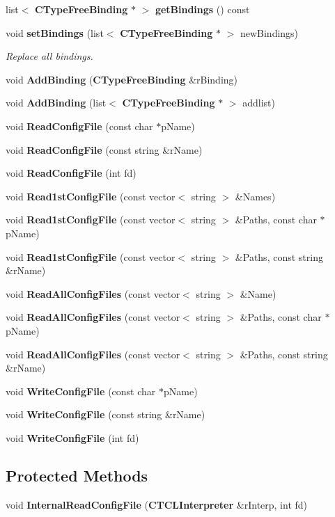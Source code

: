 \begin{CompactItemize}
\item 
list$<$ {\bf CType\-Free\-Binding} $\ast$ $>$ {\bf get\-Bindings} () const
\item 
void {\bf set\-Bindings} (list$<$ {\bf CType\-Free\-Binding} $\ast$ $>$ new\-Bindings)
\begin{CompactList}\small\item\em Replace all bindings.\item\end{CompactList}\item 
void {\bf Add\-Binding} ({\bf CType\-Free\-Binding} \&r\-Binding)
\item 
void {\bf Add\-Binding} (list$<$ {\bf CType\-Free\-Binding} $\ast$ $>$ addlist)
\item 
void {\bf Read\-Config\-File} (const char $\ast$p\-Name)
\item 
void {\bf Read\-Config\-File} (const string \&r\-Name)
\item 
void {\bf Read\-Config\-File} (int fd)
\item 
void {\bf Read1st\-Config\-File} (const vector$<$ string $>$ \&Names)
\item 
void {\bf Read1st\-Config\-File} (const vector$<$ string $>$ \&Paths, const char $\ast$p\-Name)
\item 
void {\bf Read1st\-Config\-File} (const vector$<$ string $>$ \&Paths, const string \&r\-Name)
\item 
void {\bf Read\-All\-Config\-Files} (const vector$<$ string $>$ \&Name)
\item 
void {\bf Read\-All\-Config\-Files} (const vector$<$ string $>$ \&Paths, const char $\ast$p\-Name)
\item 
void {\bf Read\-All\-Config\-Files} (const vector$<$ string $>$ \&Paths, const string \&r\-Name)
\item 
void {\bf Write\-Config\-File} (const char $\ast$p\-Name)
\item 
void {\bf Write\-Config\-File} (const string \&r\-Name)
\item 
void {\bf Write\-Config\-File} (int fd)
\end{CompactItemize}
\subsection*{Protected Methods}
\begin{CompactItemize}
\item 
void {\bf Internal\-Read\-Config\-File} ({\bf CTCLInterpreter} \&r\-Interp, int fd)
\end{CompactItemize}
